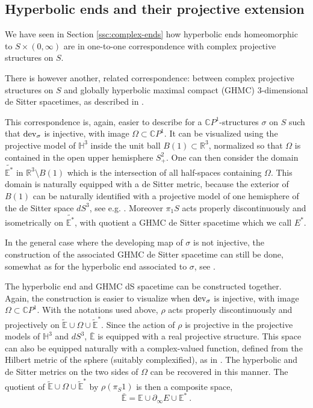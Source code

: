 \documentclass[notitlepage,twoside,a4paper]{amsart}
\theoremstyle{named}
\newcommand{\CP}{{\mathbb CP}}
\newcommand{\HH}{{\mathbb H}}
\newcommand{\R}{{\mathbb R}}
\newcommand{\bE}{{\mathbb E}}
\newcommand{\dev}{\rm{dev}}
\begin{document}
\subsection{Hyperbolic ends and their projective extension}
\label{ssc:ends}

We have seen in Section \ref{ssc:complex-ends} how hyperbolic ends homeomorphic to $S\times (0,\infty)$ are in one-to-one correspondence with complex projective structures on $S$.

There is however another, related correspondence: between complex projective structures on $S$ and globally hyperbolic maximal compact (GHMC) 3-dimensional de Sitter spacetimes, as described in \cite{scannell}.

This correspondence is, again, easier to describe for a $\CP^1$-structures $\sigma$ on $S$ such that $\dev_\sigma$ is injective, with image $\Omega\subset \CP^1$. It can be visualized using the projective model of $\HH^3$ inside the unit ball $B(1)\subset \R^3$, normalized so that $\Omega$ is contained in the open upper hemisphere $S^2_+$. One can then consider the domain $\tilde{\bE^*}$ in $\R^3\setminus B(1)$ which is the intersection of all half-spaces containing $\Omega$. This domain is naturally equipped with a de Sitter metric, because the exterior of $B(1)$ can be naturally identified with a projective model of one hemisphere of the de Sitter space $dS^3$, see e.g. \cite[Section 2]{scannell}. Moreover $\pi_1S$ acts properly discontinuously and isometrically on $\tilde{\bE^*}$, with quotient a GHMC de Sitter spacetime which we call $E^*$. 

In the general case where the developing map of $\sigma$ is not injective, the construction of the associated GHMC de Sitter spacetime can still be done, somewhat as for the hyperbolic end associated to $\sigma$, see \cite{scannell}.

The hyperbolic end and GHMC dS spacetime can be constructed together. Again, the construction is easier to visualize when $\dev_\sigma$ is injective, with image $\Omega\subset \CP^1$. With the notations used above, $\rho$ acts properly discontinuously and projectively on $\tilde\bE\cup \Omega\cup \tilde\bE^*$. Since the action of $\rho$ is projective in the projective models of $\HH^3$ and $dS^3$, $\bar\bE$ is equipped with a real projective structure. This space can also be equipped naturally with a complex-valued function, defined from the Hilbert metric of the sphere (suitably complexified), as in \cite{shu}. The hyperbolic and de Sitter metrics on the two sides of $\Omega$ can be recovered in this manner. The quotient of $\tilde\bE\cup \Omega\cup \tilde\bE^*$ by $\rho(\pi_S1)$ is then a composite space,
$$ \bar \bE = \bE\cup \partial_\infty E \cup \bE^*~. $$
\end{document}
